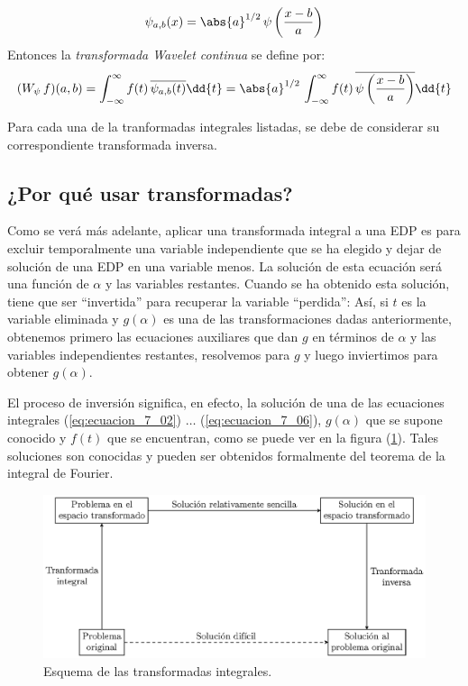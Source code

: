 \begin{enumerate}
\begin{align*}
\psi_{a, b} (x) = \abs{a}^{1/2} \, \psi \left( \dfrac{x - b}{a} \right)
\end{align*}
Entonces la \emph{transformada Wavelet continua} se define por:
\begin{align*}
(W_{\psi} \, f) (a, b) = \int_{-\infty}^{\infty} f(t) \, \overline{\psi_{a, b} (t)} \dd{t} = \abs{a}^{1/2} \, \int_{-\infty}^{\infty} f(t) \, \overline{\psi \left( \dfrac{x - b}{a} \right)} \dd{t}
\end{align*}
\end{enumerate}
Para cada una de la tranformadas integrales listadas, se debe de considerar su correspondiente transformada inversa.

\subsection{¿Por qué usar transformadas?}

Como se verá más adelante, aplicar una transformada integral a una EDP es para excluir temporalmente una variable independiente que se ha elegido y dejar de solución de una EDP en una variable menos. La solución de esta ecuación será una función de $\alpha$ y las variables restantes. Cuando se ha obtenido esta solución, tiene que ser \enquote{invertida} para recuperar la variable \enquote{perdida}: Así, si $t$ es la variable eliminada y $g (\alpha)$ es una de las transformaciones dadas anteriormente, obtenemos primero las ecuaciones auxiliares que dan $g$ en términos de $\alpha$ y las variables independientes restantes, resolvemos para $g$ y luego inviertimos para obtener $g(\alpha)$.
\par
El proceso de inversión significa, en efecto, la solución de una de las ecuaciones integrales (\ref{eq:ecuacion_7_02}) $\ldots$ (\ref{eq:ecuacion_7_06}), $g (\alpha)$ que se supone conocido y $f(t)$ que se encuentran, como se puede ver en la figura (\ref{fig:figura_01}). Tales soluciones son conocidas y pueden ser obtenidos formalmente del teorema de la integral de Fourier.
\begin{figure}[H]
    \centering
    \includegraphics[scale=1]{Imagenes/esquema_transformadas.eps}
    \caption{Esquema de las transformadas integrales.}
    \label{fig:figura_01}
\end{figure}
